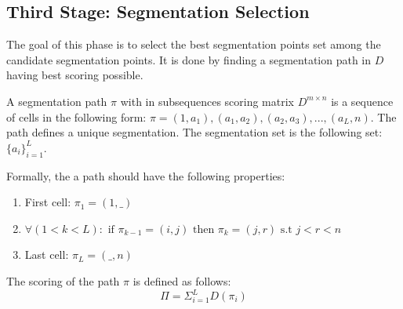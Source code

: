 \documentclass[journal,compsoc]{IEEEtran}
\begin{document}
\subsection{Third  Stage: Segmentation Selection}
The goal of this phase is to select the best segmentation points set among the candidate segmentation points. It is done by finding a segmentation path in $D$ having best scoring possible. 
 
A segmentation path $\pi$ with in subsequences scoring matrix $D^{m\times n}$ is a sequence of cells in the following form: $\pi=(1,a_{1}),(a_{1},a_{2}),(a_{2},a_{3}),...,(a_{L},n)$. The path defines a unique segmentation. The segmentation set is the following set:  $\{a_{i}\}_{i=1}^L$.

Formally, the a path should have the following properties:
\begin{enumerate}
\item First cell: $\pi_{1}=(1,\_)$
\item $ \forall (1<k<L): \mbox{ if } \pi_{k-1}=(i,j) \mbox{ then } \pi_{k}=(j,r) \mbox{ s.t } j<r<n$
\item Last cell: $\pi_{L}=(\_,n)$
\end{enumerate}
The scoring of the path $\pi$ is defined as follows:
\begin{equation}
\Pi = \Sigma_{i=1}^{L}{D(\pi_{i})}
\end{equation}
  
\end{document}
